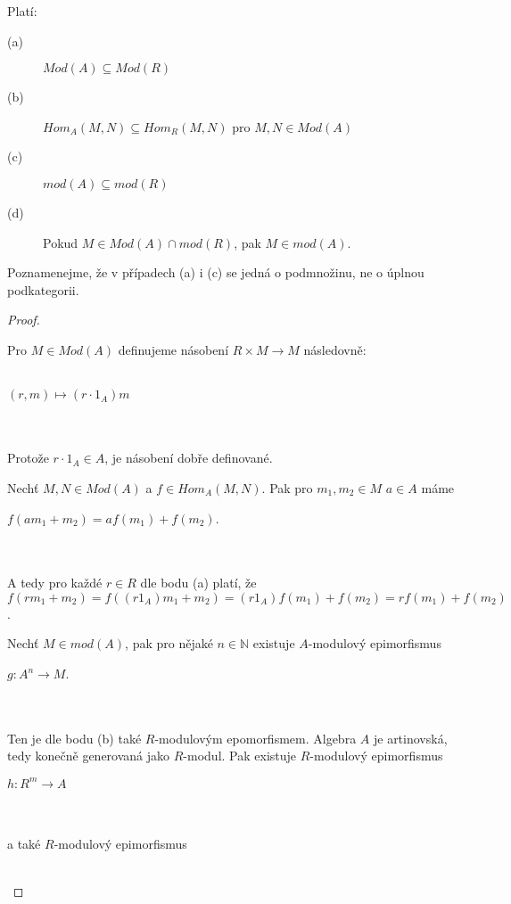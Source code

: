     \begin{lem}\label{lem-mod-Mod} Platí:
      \begin{description}
        \item[(a)] $Mod(A)\subseteq Mod(R)$
        \item[(b)] $Hom_A(M,N)\subseteq Hom_R(M,N)$ pro $M,N\in Mod(A)$ 
        \item[(c)] $mod(A)\subseteq mod(R)$   
        \item[(d)] Pokud $M\in Mod(A)\cap mod(R)$, pak $M\in mod(A)$.  
      \end{description}
      Poznamenejme, že v případech (a) i (c) se jedná o podmnožinu, ne o úplnou 
      podkategorii.
    \end{lem}
    \begin{proof}
      \begin{description}
        \item
        \item[(a)] Pro $M\in Mod(A)$ definujeme násobení $R\times M\rightarrow M$ následovně: 
          \\\\
          \centerline{$(r,m)\mapsto (r\cdot 1_A)m$}\\\\
          Protože $r\cdot 1_A\in A$, je násobení dobře definované. 
        \item[(b)] Nechť $M,N\in Mod(A)$ a $f\in Hom_A(M,N)$. Pak pro $m_1,m_2\in M$ 
          $a\in A$ máme \\
          \centerline{$f(am_1+m_2)=af(m_1)+f(m_2)$.}\\\\
          A tedy pro každé $r\in R$ dle bodu (a) platí, že
          $f(rm_1+m_2)=f((r1_A)m_1+m_2)=(r1_A)f(m_1)+f(m_2)=rf(m_1)+f(m_2)$.
        \item[(c)] Nechť $M\in mod(A)$, pak pro nějaké $n\in\mathbb{N}$ existuje
          $A$-modulový epimorfismus \\
          \centerline{$g:A^n\rightarrow M$.}\\\\
          Ten je dle bodu (b) také $R$-modulovým epomorfismem. Algebra $A$ je 
          artinovská, tedy konečně generovaná jako $R$-modul. Pak existuje  
          $R$-modulový epimorfismus \\
          \centerline{$h:R^m\rightarrow A$}\\\\
          a také $R$-modulový epimorfismus \\\\

\end{description}
\end{proof}
